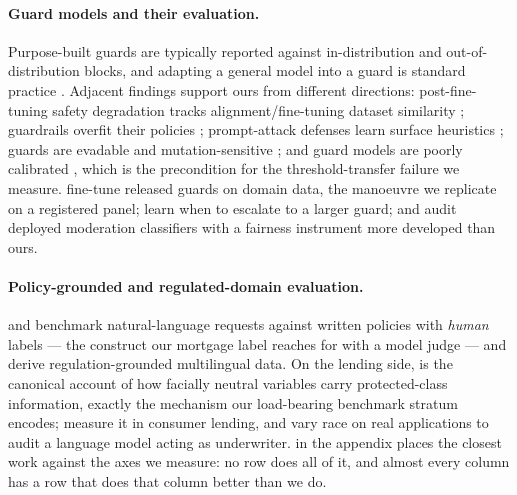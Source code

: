 \documentclass[manuscript,screen,review,anonymous]{acmart}
\begin{document}
\paragraph{Guard models and their evaluation.}\leavevmode\newline Purpose-built guards
\citep{inan2023llamaguard,han2024wildguard,zeng2024shieldgemma,padhi2024graniteguardian,qwen3guard2025}
are typically reported against in-distribution and out-of-distribution blocks, and adapting a general
model into a guard is standard practice \citep{elesedy2024loraguard}. Adjacent findings support ours
from different directions: post-fine-tuning safety degradation tracks alignment/fine-tuning dataset
similarity \citep{hsiung2025guardrails}; guardrails overfit their policies
\citep{liu2026domaingeneralizable}; prompt-attack defenses learn surface heuristics
\citep{li2026surfaceheuristics}; guards are evadable and mutation-sensitive
\citep{hackett2025bypassing,bassani2025robustness}; and guard models are poorly calibrated
\citep{liu2025calibration}, which is the precondition for the threshold-transfer failure we measure.
\citet{hossain2026safetygeometry} fine-tune released guards on domain data, the manoeuvre we replicate
on a registered panel; \citet{lee2025saferoute} learn when to escalate to a larger guard; and
\citet{achara2025watchdogs} audit deployed moderation classifiers with a fairness instrument more
developed than ours.

\paragraph{Policy-grounded and regulated-domain evaluation.} \citet{cisnerosvelarde2026policy} and
\citet{choi2026compass} benchmark natural-language requests against written policies with \emph{human}
labels --- the construct our mortgage label reaches for with a model judge --- and
\citet{zhao2026mlbenchguard} derive regulation-grounded multilingual data. On the lending side,
\citet{barocas2016disparate} is the canonical account of how facially neutral variables carry
protected-class information, exactly the mechanism our load-bearing benchmark stratum encodes;
\citet{bartlett2022fintech} measure it in consumer lending, and \citet{bowen2024mortgage} vary race on
real applications to audit a language model acting as underwriter.  in the appendix
places the closest work against the axes we measure: no row does all of it, and almost every column has
a row that does that column better than we do.
\end{document}
